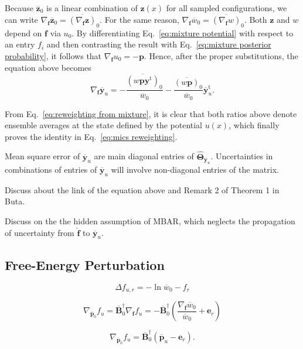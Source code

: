 \documentclass[journal=jctcce,manuscript=article,layout=twocolumn]{achemso}
\newcommand{\mt}[1]{\boldsymbol{\mathbf{#1}}}   %
\newcommand{\vt}[1]{\boldsymbol{\mathbf{#1}}}   %
\newcommand{\tr}[1]{#1^\text{t}}                %
\begin{document}
Because $\overline{\vt z}_0$ is a linear combination of $\vt z(x)$ for all sampled configurations, we can write $\nabla_{\vt f} {\overline{\vt z}_0} = \overline{(\nabla_{\vt f}{\vt z})}_0$. For the same reason, $\nabla_{\vt f} {\overline{w}_0} = \overline{(\nabla_{\vt f}{w})}_0$. Both $\vt z$ and $w$ depend on $\vt f$ via $u_0$. By differentiating Eq.~\eqref{eq:mixture potential} with respect to an entry $f_i$ and then contrasting the result with Eq.~\eqref{eq:mixture posterior probability}, it follows that $\nabla_{\vt f}u_0 = -{\vt p}$. Hence, after the proper substitutions, the equation above becomes
\begin{equation*}
\nabla_{\vt f} {\overline{\vt y}_u} = -\frac{\overline{(w{\vt p}\tr{\vt y})}_0}{\overline{w}_0} - \frac{\overline{(w {\vt p})}_0}{\overline{w}_0} \tr{\overline{\vt y}}_u.
\end{equation*}

From Eq.~\eqref{eq:reweighting from mixture}, it is clear that both ratios above denote ensemble averages at the state defined by the potential $u(x)$, which finally proves the identity in Eq.~\eqref{eq:mics reweighting}.


Mean square error of $\overline{\vt y}_u$ are main diagonal entries of $\hat{\mt \Theta}_{\overline{\vt y}_u}$. Uncertainties in combinations of entries of $\overline{\vt y}_u$ will involve non-diagonal entries of the matrix.

Discuss about the link of the equation above and Remark 2 of Theorem 1 in Buta.\cite{Buta_2010}

Discuss on the the hidden assumption of MBAR, which neglects the propagation of uncertainty from $\hat{\vt f}$ to $\overline{\vt y}_u$.

\subsection{Free-Energy Perturbation}

\begin{equation*}
\Delta f_{u,r} = -\ln \overline{w}_0 - f_r
\end{equation*}

\begin{equation*}
\nabla_{\overline{\vt p}_0}{f_u} = \overline{\mt B}_0^\dag \nabla_{\vt f}{f_u} = -\overline{\mt B}_0^\dag \left({\frac{\nabla_{\vt f} \overline{w}_0}{\overline{w}_0}} + {\vt e}_r \right)
\end{equation*}

\begin{equation*}
\nabla_{\overline{\vt p}_0}{f_u} = \overline{\mt B}_0^\dag (\overline{\vt p}_u - {\vt e}_r).
\end{equation*}
\end{document}
